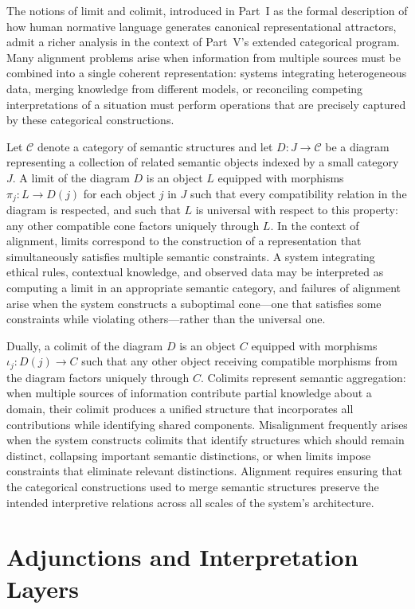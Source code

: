 \documentclass[12pt]{article}
\theoremstyle{definition}
\begin{document}
The notions of limit and colimit, introduced in Part~I as the formal description
of how human normative language generates canonical representational attractors,
admit a richer analysis in the context of Part~V's extended categorical program.
Many alignment problems arise when information from multiple sources must be
combined into a single coherent representation: systems integrating heterogeneous
data, merging knowledge from different models, or reconciling competing
interpretations of a situation must perform operations that are precisely
captured by these categorical constructions.

Let $\mathcal{C}$ denote a category of semantic structures and let $D : J \to
\mathcal{C}$ be a diagram representing a collection of related semantic objects
indexed by a small category $J$. A limit of the diagram $D$ is an object $L$
equipped with morphisms $\pi_j : L \to D(j)$ for each object $j$ in $J$ such
that every compatibility relation in the diagram is respected, and such that $L$
is universal with respect to this property: any other compatible cone factors
uniquely through $L$. In the context of alignment, limits correspond to the
construction of a representation that simultaneously satisfies multiple semantic
constraints. A system integrating ethical rules, contextual knowledge, and
observed data may be interpreted as computing a limit in an appropriate semantic
category, and failures of alignment arise when the system constructs a suboptimal
cone---one that satisfies some constraints while violating others---rather than
the universal one.

Dually, a colimit of the diagram $D$ is an object $C$ equipped with morphisms
$\iota_j : D(j) \to C$ such that any other object receiving compatible morphisms
from the diagram factors uniquely through $C$. Colimits represent semantic
aggregation: when multiple sources of information contribute partial knowledge
about a domain, their colimit produces a unified structure that incorporates all
contributions while identifying shared components. Misalignment frequently arises
when the system constructs colimits that identify structures which should remain
distinct, collapsing important semantic distinctions, or when limits impose
constraints that eliminate relevant distinctions. Alignment requires ensuring
that the categorical constructions used to merge semantic structures preserve the
intended interpretive relations across all scales of the system's architecture.

\section{Adjunctions and Interpretation Layers}
\end{document}

